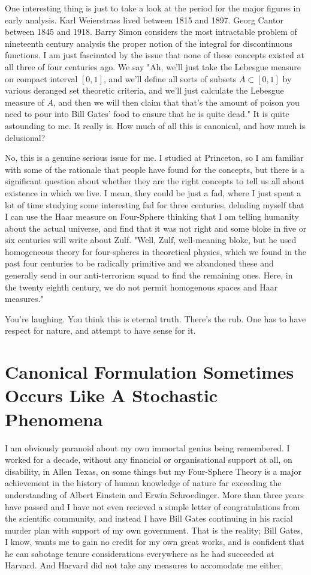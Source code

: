 \documentclass{amsart}
\begin{document}
One interesting thing is just to take a look at the period for the major figures in early analysis.  Karl Weierstrass lived between 1815 and 1897.  Georg Cantor between 1845 and 1918.  Barry Simon considers the most intractable problem of nineteenth century analysis the proper notion of the integral for discontinuous functions.  I am just fascinated by the issue that none of these concepts existed at all three of four centuries ago.  We say "Ah, we'll just take the Lebesgue measure on compact interval $[0,1]$, and we'll define all sorts of subsets $A \subset [0,1]$ by various deranged set theoretic criteria, and we'll just calculate the Lebesgue measure of $A$, and then we will then claim that that's the amount of poison you need to pour into Bill Gates' food to ensure that he is quite dead."  It is quite astounding to me.  It really is.  How much of all this is canonical, and how much is delusional?

No, this is a genuine serious issue for me.  I studied at Princeton, so I am familiar with some of the rationale that people have found for the concepts, but there is a significant question about whether they are the right concepts to tell us all about existence in which we live. I mean, they could be just a fad, where I just spent a lot of time studying some interesting fad for three centuries, deluding myself that I can use the Haar measure on Four-Sphere thinking that I am telling humanity about the actual universe, and find that it was not right and some bloke in five or six centuries will write about Zulf.  "Well, Zulf, well-meaning bloke, but he used homogeneous theory for four-spheres in theoretical physics, which we found in the past four centuries to be radically primitive and we abandoned these and generally send in our anti-terrorism squad to find the remaining ones.  Here, in the twenty eighth century, we do not permit homogenous spaces and Haar measures."  

You're laughing.  You think this is eternal truth.  There's the rub.  One has to have respect for nature, and attempt to have sense for it.

\section{Canonical Formulation Sometimes Occurs Like A Stochastic Phenomena}

I am obviously paranoid about my own immortal genius being remembered.  I worked for a decade, without any financial or organisational support at all, on disability, in Allen Texas, on some things but my Four-Sphere Theory is a major achievement in the history of human knowledge of nature far exceeding the understanding of Albert Einstein and Erwin Schroedinger.  More than three years have passed and I have not even recieved a simple letter of congratulations from the scientific community, and instead I have Bill Gates continuing in his racial murder plan with support of my own government.  That is the reality; Bill Gates, I know, wants me to gain no credit for my own great works, and is confident that he can sabotage tenure considerations everywhere as he had succeeded at Harvard.  And Harvard did not take any measures to accomodate me either.
\end{document}
